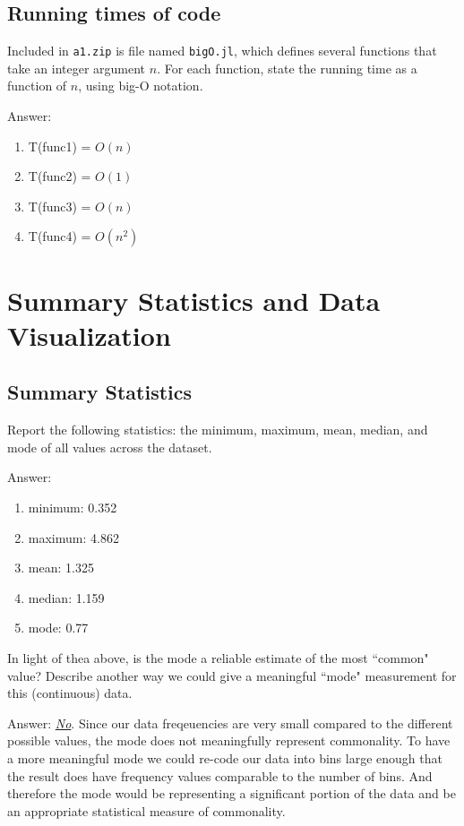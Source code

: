 \documentclass{article}
\def\ans#1{\par\gre{Answer: #1}}
\def\blu#1{{\color{blu}#1}}
\def\gre#1{{\color{gre}#1}}
\begin{document}
\subsection{Running times of code}

Included in \texttt{a1.zip} is file named \texttt{bigO.jl}, which defines several functions
that take an integer argument $n$. For each function, \blu{state the running time as a function of $n$, using big-O notation}.

\ans{
	\begin{enumerate}
		\item T(func1) = $O(n)$
		\item T(func2) = $O(1)$
		\item T(func3) = $O(n)$
		\item T(func4) = $O(n^2)$
	\end{enumerate}
}

\section{Summary Statistics and Data Visualization}

\subsection{Summary Statistics}

\blu{Report the following statistics}: the minimum, maximum, mean, median, and mode of all values across the dataset.
\ans{
	\begin{enumerate}
		\item minimum: 0.352
		\item maximum: 4.862
		\item mean: 1.325
		\item median: 1.159
		\item mode: 0.77
	\end{enumerate}
}

In light of thea above, \blu{is the mode a reliable estimate of the most ``common" value? Describe another way we could give a meaningful ``mode" measurement for this (continuous) data.}

\ans{
	\emph{\underline{No}}. Since our data freqeuencies are very small compared to the different possible values, the mode does not meaningfully represent commonality. To have a more meaningful mode we could re-code our data into bins large enough that the result does have frequency values comparable to the number of bins. And therefore the mode would be representing a significant portion of the data and be an appropriate statistical measure of commonality.
}
\end{document}
